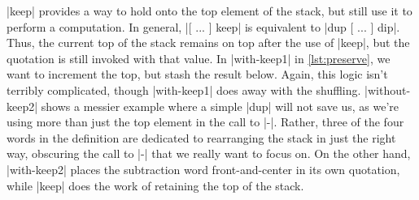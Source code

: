 \factor|keep| provides a way to hold onto the top element of the stack, but
still use it to perform a computation.  In general,
%
\factor|[ ... ] keep|
%
is equivalent to
%
\factor|dup [ ... ] dip|.
%
Thus, the current top of the stack remains on top after the use of
\factor|keep|, but the quotation is still invoked with that value.  In
\factor|with-keep1| in \vref{lst:preserve}, we want to increment the top, but
stash the result below.  Again, this logic isn't terribly complicated, though
\factor|with-keep1| does away with the shuffling.  \factor|without-keep2| shows
a messier example where a simple \factor|dup| will not save us, as we're using
more than just the top element in the call to \factor|-|.  Rather, three of the
four words in the definition are dedicated to rearranging the stack in just the
right way, obscuring the call to \factor|-| that we really want to focus on.
On the other hand, \factor|with-keep2| places the subtraction word
front-and-center in its own quotation, while \factor|keep| does the work of
retaining the top of the stack.
